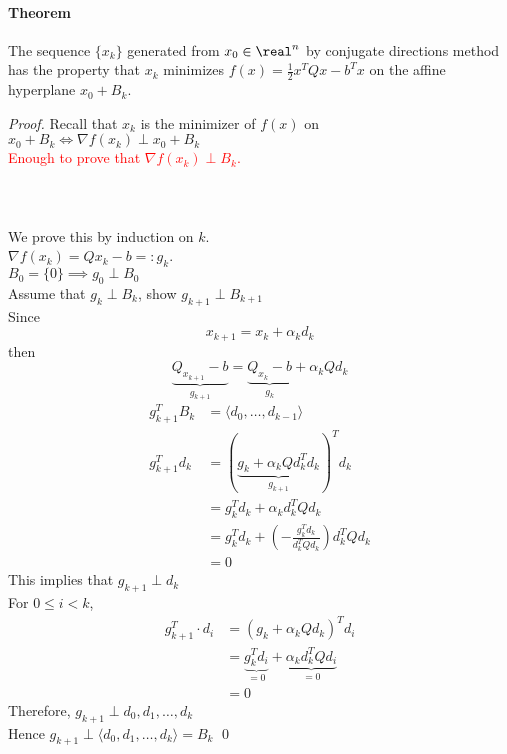 \documentclass[11pt]{article}
\begin{document}
\paragraph{Theorem}
The sequence $\{x_k\}$ generated from $x_0 \in \real^n$ by conjugate directions method has the property that $x_k$ minimizes $f(x) = \frac{1}{2}x^TQx - b^Tx$ on the affine hyperplane $x_0 + B_k$. \\
\begin{proof}
	Recall that $x_k$ is the minimizer of $f(x)$ on $x_0 + B_k \iff \nabla f(x_k) \perp x_0 + B_k$ \\
	\textcolor{red}{Enough to prove that $\nabla f(x_k) \perp B_k$.} \\\\
	 \\\\
	We prove this by induction on $k$. \\
	 $\nabla f(x_k) = Q x_k - b =: g_k$. \\
	 $B_0 = \{0\} \implies g_0 \perp B_0$ \\
	 Assume that $g_k \perp B_k$, show $g_{k+1} \perp B_{k+1}$ \\
	Since $$x_{k+1} = x_k + \alpha_k d_k$$
	then $$\underbrace{Q_{x_{k+1}} - b}_{g_{k+1}} = \underbrace{Q_{x_k} - b}_{g_k} + \alpha_k Q d_k$$
\begin{align}
	g_{k+1}^TB_k &= \langle d_0, \hdots, d_{k-1} \rangle \\
	g_{k+1}^Td_k &= (\underbrace{g_k + \alpha_k Q d_k^T d_k}_{g_{k+1}})^Td_k \\
	&= g_k^Td_k + \alpha_k d_k^T Q d_k \\
	&= g_k^Td_k + (- \frac{g_k^Td_k}{d_k^TQd_k})d_k^TQd_k \\
	&= 0
\end{align}
This implies that $g_{k+1} \perp d_k$ \\
For $0 \leq i < k$, 
\begin{align}
g_{k+1}^T\cdot d_i &= (g_k + \alpha_k Q d_k)^T d_i \\
&= \underbrace{g_k^Td_i}_{= 0} + \underbrace{\alpha_k d_k^T Q d_i}_{= 0} \\
&= 0	
\end{align}
Therefore, $g_{k+1} \perp d_0, d_1, \hdots, d_k$\\
Hence $g_{k+1} \perp \langle d_0, d_1, \hdots, d_k \rangle = B_k$
\qed 


\end{proof}
\end{document}
